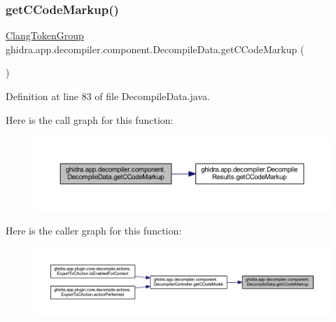 \subsubsection{\texorpdfstring{getCCodeMarkup()}{getCCodeMarkup()}}
{\footnotesize\ttfamily \mbox{\hyperlink{classghidra_1_1app_1_1decompiler_1_1_clang_token_group}{Clang\+Token\+Group}} ghidra.\+app.\+decompiler.\+component.\+Decompile\+Data.\+get\+C\+Code\+Markup (\begin{DoxyParamCaption}{ }\end{DoxyParamCaption})\hspace{0.3cm}{\ttfamily [inline]}}



Definition at line 83 of file Decompile\+Data.\+java.

Here is the call graph for this function\+:
\nopagebreak
\begin{figure}[H]
\begin{center}
\leavevmode
\includegraphics[width=350pt]{classghidra_1_1app_1_1decompiler_1_1component_1_1_decompile_data_a91564dbcfda4a4812e77a3ce7475b267_cgraph}
\end{center}
\end{figure}
Here is the caller graph for this function\+:
\nopagebreak
\begin{figure}[H]
\begin{center}
\leavevmode
\includegraphics[width=350pt]{classghidra_1_1app_1_1decompiler_1_1component_1_1_decompile_data_a91564dbcfda4a4812e77a3ce7475b267_icgraph}
\end{center}
\end{figure}
\mbox{\label{classghidra_1_1app_1_1decompiler_1_1component_1_1_decompile_data_a05529f0d3b3879b174bdf44fb5535933}} 
